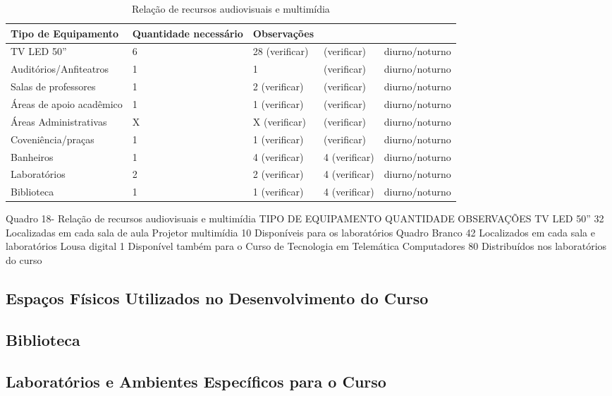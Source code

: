 \begin{table}[h]
\caption{Rela\c{c}\~ao de recursos audiovisuais e multim\'idia}
\begin{center}
\begin{tabular}{|p{4.5cm}|p{2.2cm}|p{2.2cm}|p{2.2cm}|p{3.0cm}|}
\hline
Tipo de Equipamento & Quantidade necess\'ario & Observa\c{c}\~oes\\
\hline 
\hline
TV LED 50'' &  6 & 28 (verificar) & (verificar) & diurno/noturno \\
\hline
Audit\'orios/Anfiteatros &  1 & 1 & (verificar) & diurno/noturno \\
\hline
Salas de professores & 1 & 2 (verificar) & (verificar) & diurno/noturno \\
\hline
\'Areas de apoio acad\^emico & 1 & 1 (verificar) & (verificar) & diurno/noturno \\
\hline
\'Areas Administrativas & X & X (verificar) & (verificar) & diurno/noturno \\
\hline
Coveni\^encia/pra\c{c}as & 1 & 1 (verificar) & (verificar) & diurno/noturno \\
\hline
Banheiros & 1 & 4 (verificar) & 4 (verificar) & diurno/noturno \\
\hline
Laborat\'orios & 2 & 2 (verificar) & 4 (verificar) & diurno/noturno \\
\hline
Biblioteca & 1 & 1 (verificar) & 4 (verificar) & diurno/noturno \\
\hline
\end{tabular} 
\end{center}
\label{tab:pl}
\end{table}

Quadro 18- Relação de recursos audiovisuais e multimídia
TIPO DE EQUIPAMENTO
QUANTIDADE
OBSERVAÇÕES
TV LED 50”
32
Localizadas em cada sala de aula
Projetor multimídia
10
Disponíveis para os laboratórios
Quadro Branco
42
Localizados em cada sala e laboratórios
Lousa digital
1
Disponível também para o Curso de Tecnologia em Telemática
Computadores
80
Distribuídos nos laboratórios do curso


\subsection{Espa\c{c}os F\'isicos Utilizados no Desenvolvimento do Curso}


\subsection{Biblioteca}


\subsection{Laborat\'orios e Ambientes Espec\'ificos para o Curso}



